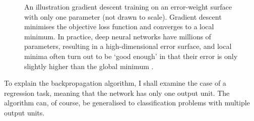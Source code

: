 \documentclass[../report.tex]{subfiles}
\begin{document}
\begin{figure}
    \centering
    \caption[An illustration gradient descent training on an error-weight surface.]{An illustration gradient descent training on an error-weight surface with only one parameter (not drawn to scale). Gradient descent minimises the objective loss function and converges to a local minimum. In practice, deep neural networks have millions of parameters, resulting in a high-dimensional error surface, and local minima often turn out to be `good enough' in that their error is only slightly higher than the global minimum \cite{lecun2015}.}
    \label{fig:gradient_descent_local_minimum}
\end{figure}

To explain the backpropagation algorithm, I shall examine the case of a regression task, meaning that the network has only one output unit.
The algorithm can, of course, be generalised to classification problems with multiple output units.
\end{document}
